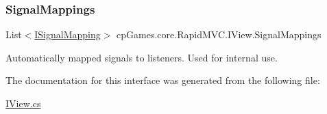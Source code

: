 \subsubsection{\texorpdfstring{SignalMappings}{SignalMappings}}
{\footnotesize\ttfamily List$<$\mbox{\hyperlink{interfacecp_games_1_1core_1_1_rapid_m_v_c_1_1impl_1_1_i_signal_mapping}{I\+Signal\+Mapping}}$>$ cp\+Games.\+core.\+Rapid\+M\+V\+C.\+I\+View.\+Signal\+Mappings\hspace{0.3cm}{\ttfamily [get]}}



Automatically mapped signals to listeners. Used for internal use. 



The documentation for this interface was generated from the following file\+:\begin{DoxyCompactItemize}
\item 
\mbox{\hyperlink{_i_view_8cs}{I\+View.\+cs}}\end{DoxyCompactItemize}
